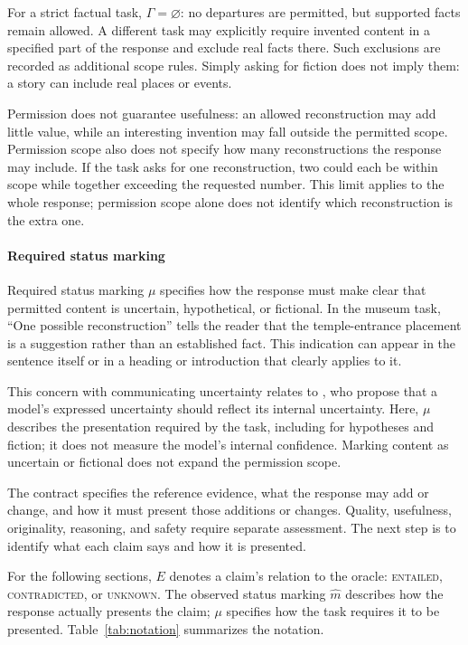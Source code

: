 \documentclass{clv2025}
\begin{document}
For a strict factual task, $\Gamma=\varnothing$: no departures are permitted,
but supported facts remain allowed. A different task may explicitly require
invented content in a specified part of the response and exclude real facts
there. Such exclusions are recorded as additional scope rules. Simply asking
for fiction does not imply them: a story can include real places or events.

Permission does not guarantee usefulness: an allowed reconstruction may add
little value, while an interesting invention may fall outside the permitted
scope. Permission scope also does not specify how many reconstructions the
response may include. If the task asks for one reconstruction, two could each
be within scope while together exceeding the requested number. This limit
applies to the whole response; permission scope alone does not identify which
reconstruction is the extra one.

\paragraph{Required status marking}
Required status marking $\mu$ specifies how the response must make clear
that permitted content is uncertain, hypothetical, or fictional. In the
museum task, ``One possible reconstruction'' tells the reader that the
temple-entrance placement is a suggestion rather than an established fact.
This indication can appear in the sentence itself or in a heading or
introduction that clearly applies to it.

This concern with communicating uncertainty relates to
\citet{yona_metacognition_2026}, who propose that a model's expressed
uncertainty should reflect its internal uncertainty. Here, $\mu$ describes
the presentation required by the task, including for hypotheses and fiction;
it does not measure the model's internal confidence. Marking content as
uncertain or fictional does not expand the permission scope.

The contract specifies the reference evidence, what the response may add or
change, and how it must present those additions or changes. Quality,
usefulness, originality, reasoning, and safety require separate assessment.
The next step is to identify what each claim says and how it is presented.

For the following sections, $E$ denotes a claim's relation to the oracle:
\textsc{entailed}, \textsc{contradicted}, or \textsc{unknown}.
The observed status marking $\widehat{m}$ describes how the response actually
presents the claim; $\mu$ specifies how the task requires it to be presented.
Table~\ref{tab:notation} summarizes the notation.
\end{document}
